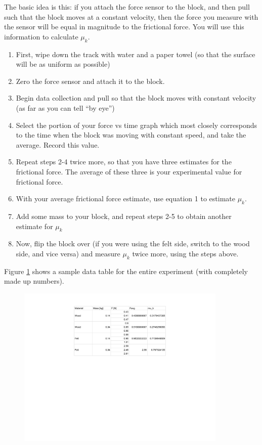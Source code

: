 \documentclass{article}
\begin{document}
The basic idea is this: if you attach the force sensor to the block, and then pull such that the block moves at a constant velocity, then the force you measure with the sensor will be equal in magnitude to the frictional force. You will use this information to calculate $\mu_k$.

\begin{enumerate}
	\item First, wipe down the track with water and a paper towel (so that the surface will be as uniform as possible)
	\item Zero the force sensor and attach it to the block.
	\item Begin data collection and pull so that the block moves with constant velocity (as far as you can tell ``by eye'')
	\item Select the portion of your force vs time graph which most closely corresponds to the time when the block was moving with constant speed, and take the average. Record this value.
	\item Repeat steps 2-4 twice more, so that you have three estimates for the frictional force. The average of these three is your experimental value for frictional force.
	\item With your average frictional force estimate, use equation 1 to estimate $\mu_k$.
	\item Add some mass to your block, and repeat steps 2-5 to obtain another estimate for $\mu_k$
	\item Now, flip the block over (if you were using the felt side, switch to the wood side, and vice versa) and measure $\mu_k$ twice more, using the steps above.
\end{enumerate}
Figure \ref{fig1} shows a sample data table for the entire experiment (with completely made up numbers).
\begin{figure}
	\centering
	\includegraphics[width=10cm]{sample_table_friction}
	\label{fig1}
\end{figure}
\end{document}
